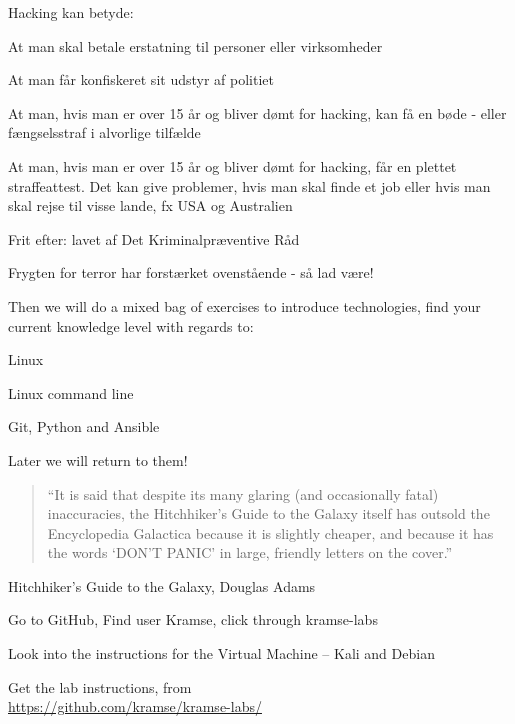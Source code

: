 \documentclass[Screen16to9,17pt]{foils}
\begin{document}
Hacking kan betyde:
\begin{list2}
\item At man skal betale erstatning til personer eller virksomheder
\item At man får konfiskeret sit udstyr af politiet
\item At man, hvis man er over 15 år og bliver dømt for hacking, kan
  få en bøde - eller fængselsstraf i alvorlige tilfælde
\item At man, hvis man er over 15 år og bliver dømt for hacking, får
en plettet straffeattest. Det kan give problemer, hvis man skal finde
et job eller hvis man skal rejse til visse lande, fx USA og
Australien
\item Frit efter:  lavet af Det
  Kriminalpræventive Råd
\item Frygten for terror har forstærket ovenstående - så lad være!
\end{list2}


Then we will do a mixed bag of exercises to introduce technologies, find your current knowledge level with regards to:

\begin{list2}
\item Linux
\item Linux command line
\item Git, Python and Ansible
\end{list2}


Later we will return to them!




\begin{quote}
“It is said that despite its many glaring (and occasionally fatal) inaccuracies, the Hitchhiker’s Guide to the Galaxy itself has outsold the Encyclopedia Galactica because it is slightly cheaper, and because it has the words ‘DON’T PANIC’ in large, friendly letters on the cover.”
\end{quote}
Hitchhiker’s Guide to the Galaxy, Douglas Adams


\begin{list2}
\item Go to GitHub, Find user Kramse, click through kramse-labs
\item Look into the instructions for the Virtual Machine -- Kali and Debian

\item Get the lab instructions, from\\ {\footnotesize\url{https://github.com/kramse/kramse-labs/}}
\end{list2}
\end{document}
